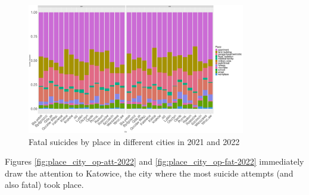 \documentclass{article}
\begin{document}
\begin{figure}[H]
    \centering
    \includegraphics[width=0.85\textwidth]{imgs/place_city_fat_suicides-2122.pdf}
    \caption{Fatal suicides by place in different cities in 2021 and 2022}
    \label{fig:place_city_fat_suicides-2122}
\end{figure}
%
Figures \ref{fig:place_city_op-att-2022} and \ref{fig:place_city_op-fat-2022}
immediately draw the attention to Katowice, the city where 
the most suicide attempts (and also fatal) took place.
%
\end{document}
